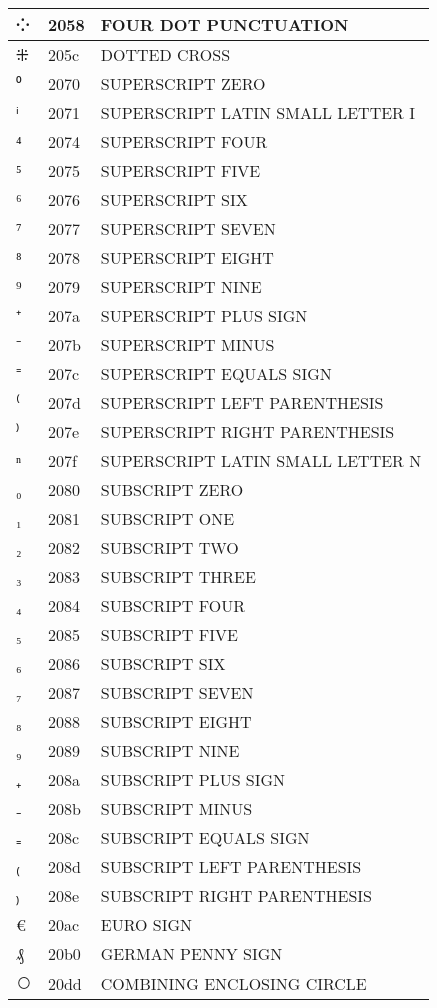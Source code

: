 \documentclass[12pt,letterpaper,openany]{book}
\begin{document}
\begin{center}
\begin{supertabular}{|m{0.25in}|m{0.5in}|m{4in}|}
⁘ & 2058 & FOUR DOT PUNCTUATION\\\hline
⁜ & 205c & DOTTED CROSS\\\hline
⁰ & 2070 & SUPERSCRIPT ZERO\\\hline
ⁱ & 2071 & SUPERSCRIPT LATIN SMALL LETTER I\\\hline
⁴ & 2074 & SUPERSCRIPT FOUR\\\hline
⁵ & 2075 & SUPERSCRIPT FIVE\\\hline
⁶ & 2076 & SUPERSCRIPT SIX\\\hline
⁷ & 2077 & SUPERSCRIPT SEVEN\\\hline
⁸ & 2078 & SUPERSCRIPT EIGHT\\\hline
⁹ & 2079 & SUPERSCRIPT NINE\\\hline
⁺ & 207a & SUPERSCRIPT PLUS SIGN\\\hline
⁻ & 207b & SUPERSCRIPT MINUS\\\hline
⁼ & 207c & SUPERSCRIPT EQUALS SIGN\\\hline
⁽ & 207d & SUPERSCRIPT LEFT PARENTHESIS\\\hline
⁾ & 207e & SUPERSCRIPT RIGHT PARENTHESIS\\\hline
ⁿ & 207f & SUPERSCRIPT LATIN SMALL LETTER N\\\hline
₀ & 2080 & SUBSCRIPT ZERO\\\hline
₁ & 2081 & SUBSCRIPT ONE\\\hline
₂ & 2082 & SUBSCRIPT TWO\\\hline
₃ & 2083 & SUBSCRIPT THREE\\\hline
₄ & 2084 & SUBSCRIPT FOUR\\\hline
₅ & 2085 & SUBSCRIPT FIVE\\\hline
₆ & 2086 & SUBSCRIPT SIX\\\hline
₇ & 2087 & SUBSCRIPT SEVEN\\\hline
₈ & 2088 & SUBSCRIPT EIGHT\\\hline
₉ & 2089 & SUBSCRIPT NINE\\\hline
₊ & 208a & SUBSCRIPT PLUS SIGN\\\hline
₋ & 208b & SUBSCRIPT MINUS\\\hline
₌ & 208c & SUBSCRIPT EQUALS SIGN\\\hline
₍ & 208d & SUBSCRIPT LEFT PARENTHESIS\\\hline
₎ & 208e & SUBSCRIPT RIGHT PARENTHESIS\\\hline
€ & 20ac & EURO SIGN\\\hline
₰ & 20b0 & GERMAN PENNY SIGN\\\hline
⃝ & 20dd & COMBINING ENCLOSING CIRCLE\\\hline

\end{supertabular}
\end{center}
\end{document}
